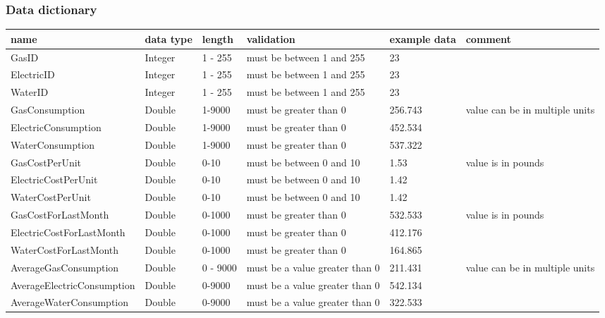 \subsubsection{Data dictionary}
\begin{center}
\begin{tabular}{|p{4.3cm}|p{1cm}|p{1.5cm}|p{3cm}|p{1.5cm}|p{2.5cm}|}
	\hline
	\textbf{name} & \textbf{data type} & \textbf{length} & \textbf{validation} & \textbf{example data} & \textbf{comment} \\ \hline
	GasID & Integer & 1 - 255 & must be between 1 and 255 & 23 &  \\ \hline
	ElectricID & Integer & 1 - 255 & must be between 1 and 255 & 23 &  \\ \hline
	WaterID & Integer & 1 - 255 & must be between 1 and 255 & 23 &  \\ \hline
	GasConsumption & Double & 1-9000 & must be greater than 0 & 256.743 & value can be in multiple units \\ \hline
	ElectricConsumption & Double & 1-9000 & must be greater than 0 & 452.534 &  \\ \hline
	WaterConsumption & Double & 1-9000 & must be greater than 0 & 537.322 &  \\ \hline
	GasCostPerUnit & Double & 0-10 & must be between 0 and 10 & 1.53 & value is in pounds \\ \hline
	ElectricCostPerUnit & Double & 0-10 & must be between 0 and 10 & 1.42 &  \\ \hline
	WaterCostPerUnit & Double & 0-10 & must be between 0 and 10 & 1.42 &  \\ \hline
	GasCostForLastMonth & Double & 0-1000 & must be greater than 0 & 532.533 & value is in pounds \\ \hline
	ElectricCostForLastMonth & Double & 0-1000 & must be greater than 0 & 412.176 &  \\ \hline
	WaterCostForLastMonth & Double & 0-1000 & must be greater than 0 & 164.865 &  \\ \hline
	AverageGasConsumption & Double & 0 - 9000 & must be a value greater than 0 & 211.431 & value can be in multiple units \\ \hline
	AverageElectricConsumption & Double & 0-9000 & must be a value greater than 0 & 542.134 &  \\ \hline
	AverageWaterConsumption & Double & 0-9000 & must be a value greater than 0 & 322.533 & \\ \hline
\end{tabular}
\end{center}
